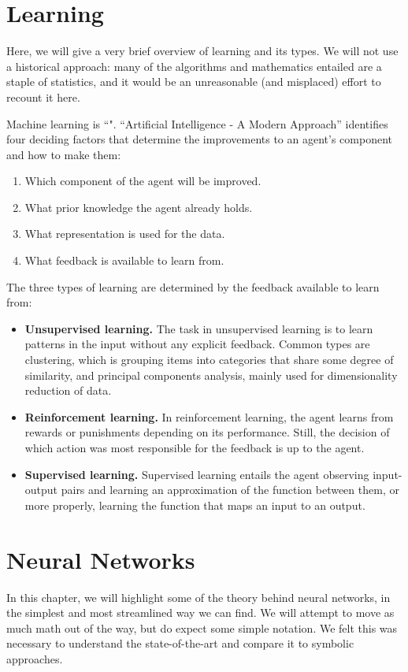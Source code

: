 \documentclass[../main.tex]{subfiles}
\begin{document}
\section{Learning}
Here, we will give a very brief overview of learning and its types. We will not use a historical approach: many of the algorithms and mathematics entailed are a staple of statistics, and it would be an unreasonable (and misplaced) effort to recount it here.

Machine learning is ``". ``Artificial Intelligence - A Modern Approach'' identifies four deciding factors that determine the improvements to an agent's component and how to make them:
\begin{enumerate}
    \item Which component of the agent will be improved.
    \item What prior knowledge the agent already holds.
    \item What representation is used for the data.
    \item What feedback is available to learn from.
\end{enumerate}
The three types of learning are determined by the feedback available to learn from:
\begin{itemize}
    \item \textbf{Unsupervised learning.} The task in unsupervised learning is to learn patterns in the input without any explicit feedback. Common types are clustering, which is grouping items into categories that share some degree of similarity, and principal components analysis, mainly used for dimensionality reduction of data.
    \item \textbf{Reinforcement learning.} In reinforcement learning, the agent learns from rewards or punishments depending on its performance. Still, the decision of which action was most responsible for the feedback is up to the agent.
    \item \textbf{Supervised learning.} Supervised learning entails the agent observing input-output pairs and learning an approximation of the function between them, or more properly, learning the function that maps an input to an output.
\end{itemize}

\section{Neural Networks}
In this chapter, we will highlight some of the theory behind neural networks, in the simplest and most streamlined way we can find. We will attempt to move as much math out of the way, but do expect some simple notation. We felt this was necessary to understand the state-of-the-art and compare it to symbolic approaches.
\end{document}
